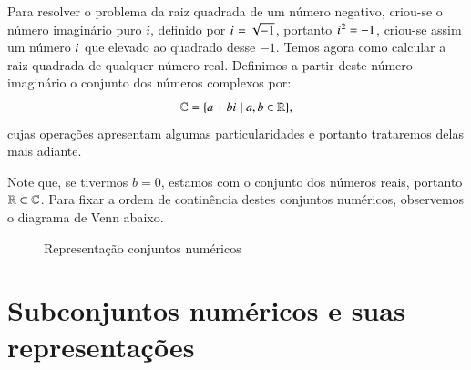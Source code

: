 Para resolver o problema da raiz quadrada de um número negativo, criou-se o número imaginário puro $i$, definido por ${i\mkern1mu}= \sqrt{-1}$, portanto ${i\mkern1mu}^2= -1$, criou-se assim um número ${i\mkern1mu}$ que elevado ao quadrado desse $-1$. Temos agora como calcular a raiz quadrada de qualquer número real. Definimos a partir deste número imaginário o conjunto dos números complexos por:
\[\mathbb{C}= \{a + b{i\mkern1mu} \mid a, b \in \mathbb{R} \} ,\]
cujas operações apresentam algumas particularidades e portanto trataremos delas mais adiante.

Note que, se tivermos $b=0$, estamos com o conjunto dos números reais, portanto $\mathbb{R} \subset \mathbb{C}$. Para fixar a ordem de continência destes conjuntos numéricos, observemos o diagrama de Venn abaixo.

 \begin{figure}[H]
 \centering
    \caption{Representação conjuntos numéricos}
  \end{figure}

\section{Subconjuntos numéricos e suas representações}


